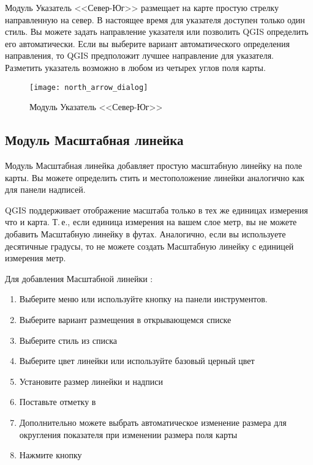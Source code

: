 Модуль Указатель <<Север-Юг>> размещает на карте простую стрелку направленную
на север. В настоящее время для указателя доступен только один стиль. Вы
можете задать направление указателя или позволить QGIS определить его
автоматически. Если вы выберите вариант автоматического определения
направления, то QGIS предположит лучшее направление для указателя. Разметить
указатель возможно в любом из четырех углов поля карты.

\begin{figure}[ht]
   \centering
   \texttt{[image: north\_arrow\_dialog]}
   \caption{Модуль Указатель <<Север-Юг>> \nixcaption}\label{fig:north_arrow}
\end{figure}

\subsection{Модуль Масштабная линейка}
Модуль Масштабная линейка добавляет простую масштабную линейку на поле
карты. Вы можете определить стить и местоположение линейки аналогично
как для панели надписей.

QGIS поддерживает отображение масштаба только в тех же единицах измерения
что и карта. Т.\,е., если единица измерения на вашем слое метр, вы не
можете добавить Масштабную линейку в футах. Аналогично, если вы используете
десятичные градусы, то не можете создать Масштабную линейку с единицей
измерения метр.

Для добавления Масштабной линейки :

\begin{enumerate}
\item Выберите меню  \arrow {}
\arrow {} или используйте
кнопку  на панели инструментов.
\item Выберите вариант размещения в открывающемся списке
\item Выберите стиль из списка 
\item Выберите цвет линейки  или используйте
базовый церный цвет
\item Установите размер линейки и надписи 
\item Поставьте отметку в 
\item Дополнительно можете выбрать автоматическое изменение размера для
округления показателя при изменении  размера поля карты \\
\item Нажмите кнопку 
\end{enumerate}

